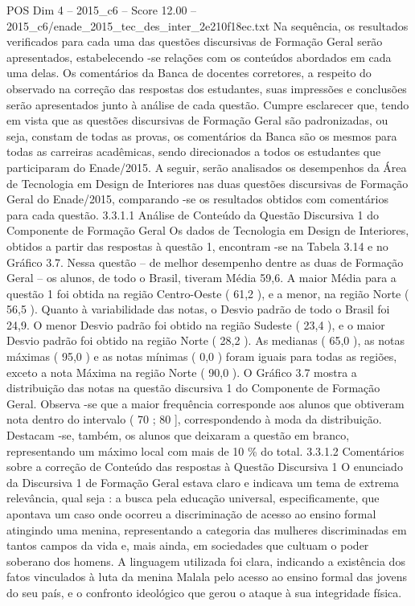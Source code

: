 \begin{textsample}{POS Dim 4 – 2015\_c6 – Score 12.00 – 2015\_c6/enade\_2015\_tec\_des\_inter\_2e210f18ec.txt}
Na sequência, os resultados verificados para cada uma das questões discursivas de Formação Geral serão apresentados, estabelecendo -se relações com os conteúdos abordados em cada uma delas.
Os comentários da Banca de docentes corretores, a respeito do observado na correção das respostas dos estudantes, suas impressões e conclusões serão apresentados junto à análise de cada questão.
Cumpre esclarecer que, tendo em vista que as questões discursivas de Formação Geral são padronizadas, ou seja, constam de todas as provas, os comentários da Banca são os mesmos para todas as carreiras acadêmicas, sendo direcionados a todos os estudantes que participaram do Enade/2015.
A seguir, serão analisados os desempenhos da Área de Tecnologia em Design de Interiores nas duas questões discursivas de Formação Geral do Enade/2015, comparando -se os resultados obtidos com comentários para cada questão. 3.3.1.1 Análise de Conteúdo da Questão Discursiva 1 do Componente de Formação Geral Os dados de Tecnologia em Design de Interiores, obtidos a partir das respostas à questão 1, encontram -se na Tabela 3.14 e no Gráfico 3.7.
Nessa questão – de melhor desempenho dentre as duas de Formação Geral – os alunos, de todo o Brasil, tiveram Média 59,6.
A maior Média para a questão 1 foi obtida na região Centro-Oeste ( 61,2 ), e a menor, na região Norte ( 56,5 ).
Quanto à variabilidade das notas, o Desvio padrão de todo o Brasil foi 24,9.
O menor Desvio padrão foi obtido na região Sudeste ( 23,4 ), e o maior Desvio padrão foi obtido na região Norte ( 28,2 ).
As medianas ( 65,0 ), as notas máximas ( 95,0 ) e as notas mínimas ( 0,0 ) foram iguais para todas as regiões, exceto a nota Máxima na região Norte ( 90,0 ).
O Gráfico 3.7 mostra a distribuição das notas na questão discursiva 1 do Componente de Formação Geral.
Observa -se que a maior frequência corresponde aos alunos que obtiveram nota dentro do intervalo ( 70 ; 80 ], correspondendo à moda da distribuição.
Destacam -se, também, os alunos que deixaram a questão em branco, representando um máximo local com mais de 10 \% do total. 3.3.1.2 Comentários sobre a correção de Conteúdo das respostas à Questão Discursiva 1 O enunciado da Discursiva 1 de Formação Geral estava claro e indicava um tema de extrema relevância, qual seja : a busca pela educação universal, especificamente, que apontava um caso onde ocorreu a discriminação de acesso ao ensino formal atingindo uma menina, representando a categoria das mulheres discriminadas em tantos campos da vida e, mais ainda, em sociedades que cultuam o poder soberano dos homens.
A linguagem utilizada foi clara, indicando a existência dos fatos vinculados à luta da menina Malala pelo acesso ao ensino formal das jovens do seu país, e o confronto ideológico que gerou o ataque à sua integridade física.

\end{textsample}
